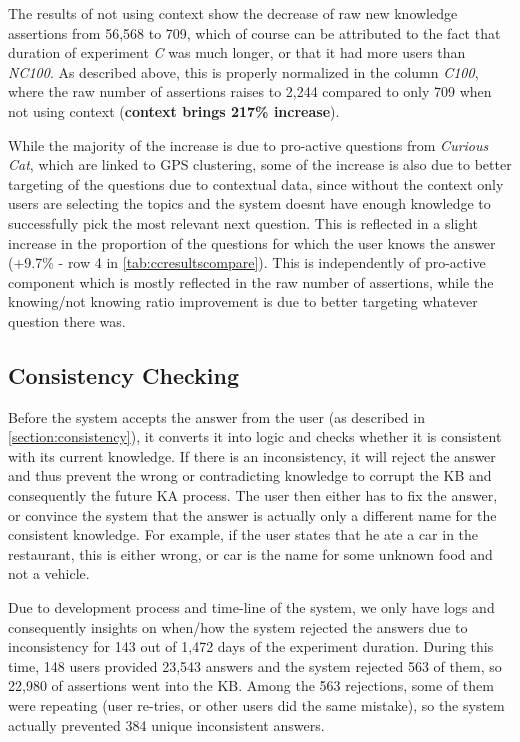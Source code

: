 {The results of not using context show the decrease of raw new knowledge 
assertions from 56,568 to 709, which of course can be attributed to the fact 
that duration of experiment \emph{C} was much longer, or that it had more users
than \emph{NC100}. As described above, this is properly normalized in the 
column \emph{C100}, where the raw number of assertions raises to 2,244 
compared to only 709 when not using context (\textbf{context brings 217\% 
increase}).

While the majority of the increase is due to pro-active questions from 
\emph{Curious Cat}, which are linked to GPS clustering, some of the increase 
is also due to better targeting of the questions due to contextual data, 
since without the context only users are selecting the topics and the system 
doesnt have enough knowledge to successfully pick the most relevant next 
question. This is reflected in a slight increase in the proportion of the 
questions for which the user knows the answer (+9.7\% - row 4 in 
\autoref{tab:ccresultscompare}). This is independently of pro-active component 
which is mostly reflected in the raw number of assertions, while the 
knowing/not knowing ratio improvement is due to better targeting whatever 
question there was.

\subsection{Consistency Checking}
\label{section:resultsConsistencyChecking}
Before the system accepts the answer from the user (as described in 
\autoref{section:consistency}), it converts it into logic and checks whether it 
is consistent with its current knowledge. If there is an inconsistency, it will 
reject the answer and thus prevent the wrong or contradicting knowledge to 
corrupt the KB and consequently the future KA process. The user then either has
to fix the answer, or convince the system that the answer is actually only a 
different name for the consistent knowledge. For example, if the user states 
that he ate a car in the restaurant, this is either wrong, or car is the name 
for some unknown food and not a vehicle.

Due to development process and time-line of the system, we only have logs and 
consequently insights on when/how the system rejected the answers due to 
inconsistency for 143 out of 1,472 days of the experiment duration. During 
this time, 148 users provided 23,543 answers and the system rejected 563 of 
them, so 22,980 of assertions went into the KB. Among the 563 rejections, 
some of them were repeating (user re-tries, or other users did the same 
mistake), so the system actually prevented 384 unique inconsistent answers.

}
